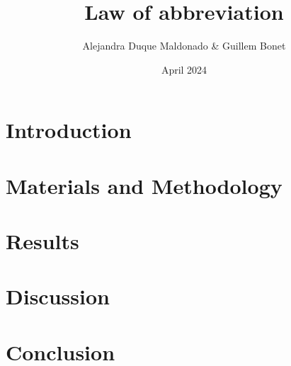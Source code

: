 \documentclass{article}
\title{Law of abbreviation}
\author{Alejandra Duque Maldonado \& Guillem Bonet}
\date{April 2024}
\begin{document}
  \maketitle

  \section{Introduction}
    
  \section{Materials and Methodology}
   
  \section{Results}
   
  \section{Discussion}
    

  \section{Conclusion}
   


\nocite{*}
\newpage

\end{document}

